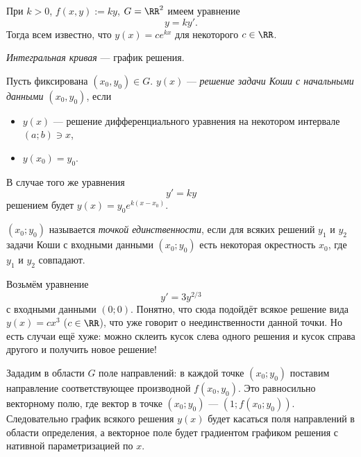 \documentclass[12pt,a4paper]{article}
\begin{document}
    \begin{example}
        При $k > 0$, $f(x, y) := ky$, $G = \RR^2$ имеем уравнение
        \[y = ky'.\]
        Тогда всем известно, что $y(x) = c e^{kx}$ для некоторого $c \in \RR$.
    \end{example}

    \begin{definition}
        \emph{Интегральная кривая} --- график решения.
    \end{definition}

    \begin{definition}
        Пусть фиксирована $(x_0, y_0) \in G$. $y(x)$ --- \emph{решение задачи Коши с начальными данными $(x_0, y_0)$}, если
        \begin{itemize}
            \item $y(x)$ --- решение дифференциального уравнения на некотором интервале $(a; b) \ni x$,
            \item $y(x_0) = y_0$.
        \end{itemize}
    \end{definition}

    \begin{example}
        В случае того же уравнения
        \[y' = ky\]
        решением будет $y(x) = y_0 e^{k(x - x_0)}$.
    \end{example}

    \begin{definition}
        $(x_0; y_0)$ называется \emph{точкой единственности}, если для всяких решений $y_1$ и $y_2$ задачи Коши с входными данными $(x_0; y_0)$ есть некоторая окрестность $x_0$, где $y_1$ и $y_2$ совпадают.
    \end{definition}

    \begin{example}
        Возьмём уравнение
        \[y' = 3 y^{2/3}\]
        с входными данными $(0; 0)$. Понятно, что сюда подойдёт всякое решение вида $y(x) = cx^3$ ($c \in \RR$), что уже говорит о неединственности данной точки. Но есть случаи ещё хуже: можно склеить кусок слева одного решения и кусок справа другого и получить новое решение!
    \end{example}

    \begin{definition}
        Зададим в области $G$ поле направлений: в каждой точке $(x_0; y_0)$ поставим направление соответствующее производной $f(x_0, y_0)$. Это равносильно векторному полю, где вектор в точке $(x_0; y_0)$ --- $(1; f(x_0; y_0))$. Следовательно график всякого решения $y(x)$ будет касаться поля направлений в области определения, а векторное поле будет градиентом графиком решения с нативной параметризацией по $x$.
    \end{definition}
\end{document}
